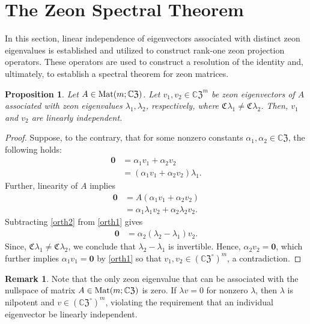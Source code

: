 \documentclass{article}
\newtheorem{proposition}[theorem]{Proposition}
\theoremstyle{definition}
\newtheorem{remark}[theorem]{Remark}
\newcommand{\zco}{\mathfrak{C}\mspace{1mu}}
\newcommand{\CZ}{\mathbb{C}\mathfrak{Z}}
\newcommand{\Mat}{{\rm Mat}}
\newcommand{\zm}{\mathbf{0}}
\numberwithin{equation}{section}
\begin{document}
\section{The Zeon Spectral Theorem}\label{zeon spectral theorem}

In this section, linear independence of eigenvectors associated with distinct zeon eigenvalues is established and utilized to construct rank-one zeon projection operators.  These operators are used to construct a resolution of the identity and, ultimately, to establish a spectral theorem for zeon matrices. 

\begin{proposition}
Let $A\in \Mat(m;\CZ)$.  Let $v_1,v_2\in{\CZ}^m$ be zeon eigenvectors of $A$ associated with zeon eigenvalues $\lambda_1, \lambda_2$, respectively, where $\zco \lambda_1\ne \zco \lambda_2$.  Then, $v_1$ and $v_2$ are linearly independent.
\end{proposition}

\begin{proof}
Suppose, to the contrary, that for some nonzero constants $\alpha_1, \alpha_2\in\CZ$, the following holds:\begin{align}
\zm&=\alpha_1v_1+\alpha_2v_2\nonumber\\
&=(\alpha_1v_1+\alpha_2v_2)\lambda_1.\label{orth1}
\end{align}
Further, linearity of $A$ implies
\begin{align}
\zm&=A(\alpha_1v_1+\alpha_2v_2)\nonumber\\
&=\alpha_1\lambda_1v_2+\alpha_2\lambda_2v_2.\label{orth2}
\end{align}
Subtracting \eqref{orth2} from \eqref{orth1} gives
\begin{align*}
\zm&=\alpha_2(\lambda_2-\lambda_1)v_2.
\end{align*}
Since, $\zco\lambda_1\ne\zco\lambda_2$, we conclude that $\lambda_2-\lambda_1$ is invertible.  Hence, $\alpha_2 v_2=\zm$, which further implies $\alpha_1v_1=\zm$ by \eqref{orth1} so that $v_1,v_2\in({\CZ}^\circ)^m$, a contradiction.   
\end{proof}

\begin{remark}
Note that the only zeon eigenvalue that can be associated with the nullspace of matrix $A\in\Mat(m;\CZ)$ is zero.  If $\lambda v=0$ for nonzero $\lambda$, then $\lambda$ is nilpotent and $v\in({\CZ}^\circ)^m$, violating the requirement that an individual eigenvector be linearly independent.  
\end{remark}
\end{document}
